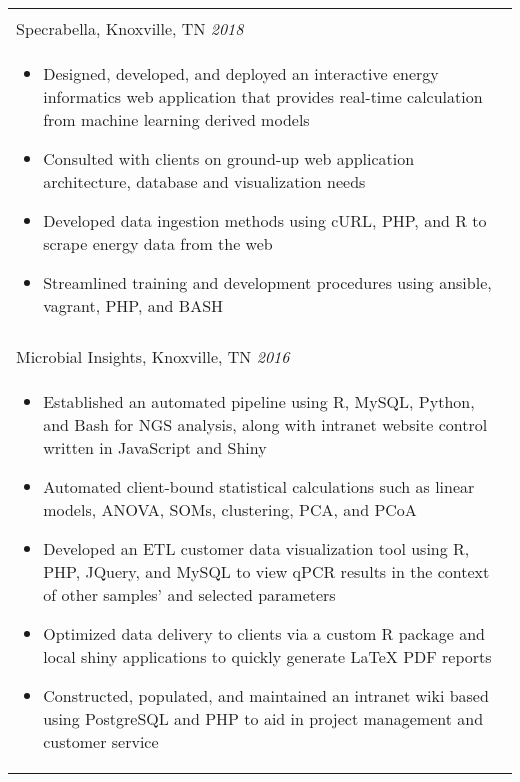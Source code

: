\documentclass[10pt]{article}%
\begin{document}
   \newpage
   \begin{tabularx}{\linewidth}{M}%
          \\
         Specrabella, Knoxville, TN \textit{2018  } \\
      \begin{itemize}[topsep=-12pt,parsep=0em]
         \setlength\itemsep{0em}
         \item Designed, developed, and deployed an interactive energy informatics web application that provides real-time calculation from machine learning derived models %
         \item Consulted with clients on ground-up web application architecture, database and visualization needs%
          \item Developed data ingestion methods using cURL, PHP, and R to scrape energy data from the web %
          \item Streamlined training and development procedures using ansible, vagrant, PHP, and BASH %
      \end{itemize} \\
       \\
      Microbial Insights, Knoxville, TN \textit{2016 } \\
      \begin{itemize}[topsep=-12pt,parsep=0em]
         \setlength\itemsep{0em}
         \item Established an automated pipeline using R, MySQL, Python, and Bash for NGS analysis, along with intranet website control written in JavaScript and Shiny  %
         \item Automated client-bound statistical calculations such as linear models, ANOVA, SOMs, clustering, PCA, and PCoA %
         \item Developed an ETL customer data visualization tool using R, PHP, JQuery, and MySQL to view qPCR results in the context of other samples' and selected parameters %
         \item Optimized data delivery to clients via a custom R package and local shiny applications to quickly generate \LaTeX{} PDF reports  %
         \item Constructed, populated, and maintained an intranet wiki based using PostgreSQL and PHP to aid in project management and customer service
        \end{itemize} \\

\end{tabularx}
\end{document}
